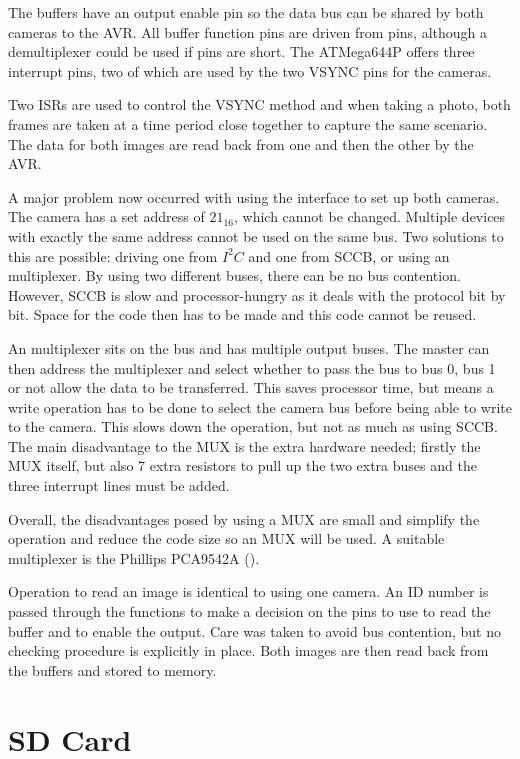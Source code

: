 The buffers have an output enable pin so the data bus can be shared by both cameras to the AVR. All buffer function pins are driven from pins, although a demultiplexer could be used if pins are short. The ATMega644P offers three interrupt pins, two of which are used by the two VSYNC pins for the cameras.

Two ISRs are used to control the VSYNC method and when taking a photo, both frames are taken at a time period close together to capture the same scenario. The data for both images are read back from one and then the other by the AVR. 

A major problem now occurred with using the \itc interface to set up both cameras. The camera has a set \itc address of $21_{16}$, which cannot be changed. Multiple \itc devices with exactly the same address cannot be used on the same bus. 
Two solutions to this are possible: driving one from $I^{2}C$ and one from SCCB, or using an \itc multiplexer. By using two different buses, there can be no bus contention. However, SCCB is slow and processor-hungry as it deals with the protocol bit by bit. Space for the code then has to be made and this code cannot be reused. 

An \itc multiplexer sits on the bus and has multiple output buses. The master can then address the multiplexer and select whether to pass the bus to bus 0, bus 1 or not allow the data to be transferred. This saves processor time, but means a write operation has to be done to select the camera bus before being able to write to the camera. This slows down the operation, but not as much as using SCCB. The main disadvantage to the \itc MUX is the extra hardware needed; firstly the MUX itself, but also 7 extra resistors to pull up the two extra buses and the three interrupt lines must be added. 

Overall, the disadvantages posed by using a MUX are small and simplify the operation and reduce the code size so an \itc MUX will be used. A suitable multiplexer is the Phillips PCA9542A (\cite{I2C_Mux}).

Operation to read an image is identical to using one camera. An ID number is passed through the functions to make a decision on the pins to use to read the buffer and to enable the output. Care was taken to avoid bus contention, but no checking procedure is explicitly in place. Both images are then read back from the buffers and stored to memory. 

\section{SD Card} \label{sect:SDCard}

